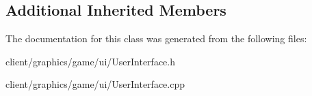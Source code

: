 \subsection*{Additional Inherited Members}


The documentation for this class was generated from the following files\-:\begin{DoxyCompactItemize}
\item 
client/graphics/game/ui/User\-Interface.\-h\item 
client/graphics/game/ui/User\-Interface.\-cpp\end{DoxyCompactItemize}
